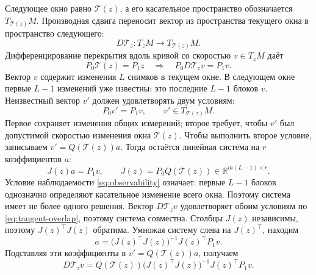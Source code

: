 \documentclass[11pt,a4paper]{article}
\begin{document}
Следующее окно равно $\mathcal T(z)$, а его касательное пространство
обозначается $T_{\mathcal T(z)}M$.
Производная сдвига переносит вектор из пространства текущего окна
в пространство следующего:
$$
D\mathcal T_z:T_zM\longrightarrow T_{\mathcal T(z)}M.
$$
Дифференцирование перекрытия вдоль кривой со скоростью $v\in T_zM$ даёт
\begin{equation}
P_0\mathcal T(z)=P_1z
\quad\Longrightarrow\quad P_0D\mathcal T_zv=P_1v.
\label{eq:tangent-overlap}
\end{equation}
Вектор $v$ содержит изменения $L$ снимков в текущем окне.
В следующем окне первые $L-1$ изменений уже известны: это последние
$L-1$ блоков $v$. Неизвестный вектор $v'$ должен удовлетворять двум условиям:
$$
P_0v'=P_1v,\qquad v'\in T_{\mathcal T(z)}M.
$$
Первое сохраняет изменения общих измерений; второе требует, чтобы $v'$
был допустимой скоростью изменения окна $\mathcal T(z)$.
Чтобы выполнить второе условие, записываем $v'=Q(\mathcal T(z))a$.
Тогда остаётся линейная система на $r$ коэффициентов $a$:
$$
J(z)a=P_1v,\qquad
J(z)=P_0Q(\mathcal T(z))\in\mathbb R^{m(L-1)\times r}.
$$
Условие наблюдаемости \eqref{eq:observability} означает: первые $L-1$ блоков
однозначно определяют касательное изменение всего окна.
Поэтому система имеет не более одного решения.
Вектор $D\mathcal T_zv$ удовлетворяет обоим условиям по \eqref{eq:tangent-overlap},
поэтому система совместна. Столбцы $J(z)$ независимы,
поэтому $J(z)^\top J(z)$ обратима.
Умножая систему слева на $J(z)^\top$, находим
$$
a=\bigl(J(z)^\top J(z)\bigr)^{-1}J(z)^\top P_1v.
$$
Подставляя эти коэффициенты в $v'=Q(\mathcal T(z))a$, получаем
\begin{equation}
D\mathcal T_zv=Q(\mathcal T(z))
\bigl(J(z)^\top J(z)\bigr)^{-1}J(z)^\top P_1v.
\label{eq:tangent-transfer}
\end{equation}
\end{document}
